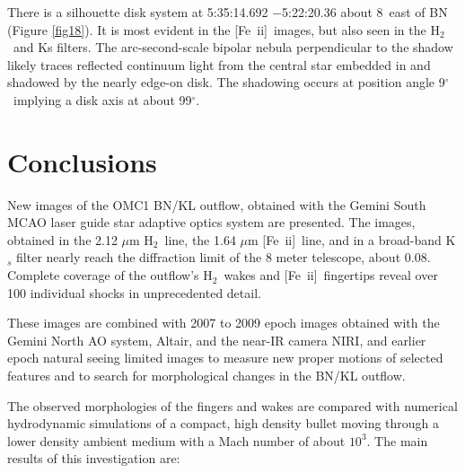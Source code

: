 \documentclass{aa}
\newcommand\arcdeg{\mbox{$^\circ$}\xspace}  %
\newcommand{\Feii}{[Fe~{\sc ii}]}
\newcommand{\hh}{\ensuremath{\textrm{H}_{2}}}			%
\begin{document}
There is a silhouette disk system at 5:35:14.692 $-$5:22:20.36 about 8\arcsec\  
east of  BN (Figure \ref{fig18}).  It is most evident  in the \Feii\  images, but also 
seen  in the \hh\  and Ks filters.   The arc-second-scale bipolar nebula perpendicular 
to the shadow  likely traces reflected continuum light from the central star
embedded in and shadowed by the nearly  edge-on disk.    The shadowing 
occurs at position angle 9\arcdeg\ implying a disk axis at about 99\arcdeg .    

\section{Conclusions}

New images of the OMC1 BN/KL outflow, obtained with the Gemini South 
MCAO laser guide star adaptive optics system are presented.   The images,
obtained in the 2.12 $\mu$m \hh\ line, the 1.64 $\mu$m \Feii\ line, and in a
broad-band K$_s$ filter nearly reach the diffraction limit of the 8 meter telescope,
about 0.08\arcsec.     Complete coverage of the outflow's \hh\ wakes and \Feii\ 
fingertips reveal over 100 individual shocks in unprecedented detail.  

These images are combined with 2007 to 2009 epoch images obtained with the
Gemini North AO system, Altair, and the near-IR camera NIRI, and earlier epoch
natural seeing limited images to measure new proper motions of selected 
features and to search for morphological changes in the BN/KL outflow.

The observed morphologies of the fingers and wakes are compared with 
numerical hydrodynamic simulations of a compact, high density bullet moving through
a lower density ambient medium with a Mach number of about $10^3$.    The 
main results of this investigation are:
\end{document}
